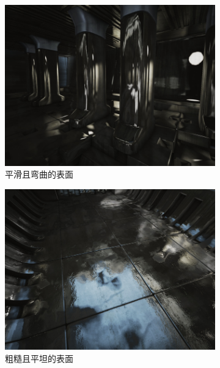 \begin{figure}
\begin{fullwidth}
	\begin{subfigure}[b]{0.33\thewidth}
		\includegraphics[width=\textwidth]{figures/pl/reflection-1}
		\caption{平滑且弯曲的表面}
	\end{subfigure}
	\begin{subfigure}[b]{0.33\thewidth}
		\includegraphics[width=\textwidth]{figures/pl/reflection-2}
			\caption{粗糙且平坦的表面}
	\end{subfigure}
	\begin{subfigure}[b]{0.33\thewidth}

\end{subfigure}
\end{fullwidth}
\end{figure}
